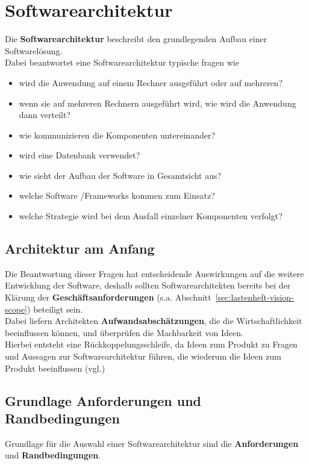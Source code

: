 \section{Softwarearchitektur}\label{sec:softwarearchitektur}

Die \textbf{Softwarearchitektur} beschreibt den grundlegenden Aufbau einer Softwarelösung.\\

\noindent
Dabei beantwortet eine Softwarearchitektur typische fragen wie

\begin{itemize}
    \item wird die Anwendung auf einem Rechner ausgeführt oder auf mehreren?
    \item wenn sie auf mehreren Rechnern ausgeführt wird, wie wird die Anwendung dann verteilt?
    \item wie kommunizieren die Komponenten untereinander?
    \item wird eine Datenbank verwendet?
    \item wie sieht der Aufbau der Software in Gesamtsicht aus?
    \item welche Software /Frameworks kommen zum Einsatz?
    \item welche Strategie wird bei dem Ausfall einzelner Komponenten verfolgt?
\end{itemize}

\subsection*{Architektur am Anfang}
Die Beantwortung dieser Fragen hat entscheidende Auswirkungen auf die weitere Entwicklung der Software, deshalb sollten Softwarearchitekten bereits bei der Klärung der \textbf{Geschäftsanforderungen} (s.a. Abschnitt~\ref{sec:lastenheft-vision-scope}) beteiligt sein.\\

\noindent
Dabei liefern Architekten \textbf{Aufwandsabschätzungen}, die die Wirtschaftlichkeit beeinflussen können, und überprüfen die Machbarkeit von Ideen.\\
Hierbei entsteht eine Rückkoppelungsschleife, da Ideen zum Produkt zu Fragen und Aussagen zur Softwarearchitektur führen, die wiederum die Ideen zum Produkt beeinflussen (vgl.\cite[37]{Wed09b})

\subsection*{Grundlage Anforderungen und Randbedingungen}
Grundlage für die Auswahl einer Softwarearchitektur sind die \textbf{Anforderungen} und \textbf{Randbedingungen}.

